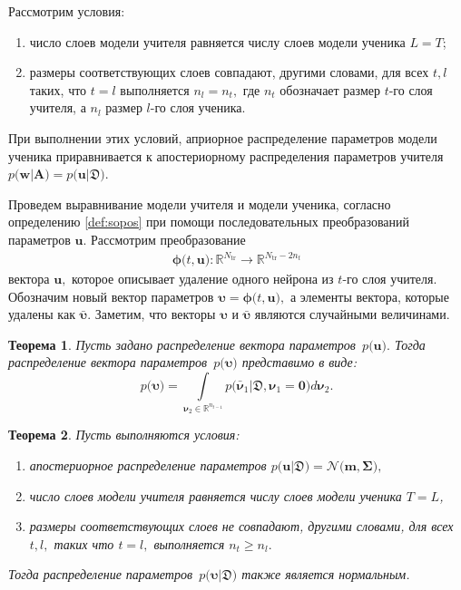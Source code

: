 \documentclass{dissert}
\newtheorem{theorem}{Теорема}
\begin{document}
Рассмотрим условия:
\begin{enumerate}[1)]
    \item число слоев модели учителя равняется числу слоев модели ученика $L=T$;
    \item размеры соответствующих слоев совпадают, другими словами, для всех $t, l$ таких, что $t=l$ выполняется $n_l = n_t,$ где $n_t$ обозначает размер $t$-го слоя учителя, а $n_l$ размер $l$-го слоя ученика.
\end{enumerate}
При выполнении этих условий, априорное распределение параметров модели ученика приравнивается к апостериорному распределения параметров учителя $p\bigr(\mathbf{w}|\mathbf{A}\bigr) = p\bigr(\mathbf{u}|\mathfrak{D}\bigr)$.


Проведем выравнивание модели учителя и модели ученика, согласно определению \ref{def:sopos} при помощи последовательных преобразований параметров $\mathbf{u}$. Рассмотрим преобразование
\[
\label{ch:3:eq:ap:2}
\begin{aligned}
\bm{\phi}\bigr(t, \mathbf{u}\bigr) : \mathbb{R}^{N_{\text{tr}}} \to \mathbb{R}^{N_{\text{tr}}-2n_t}
\end{aligned}
\]
вектора $\mathbf{u},$ которое описывает удаление одного нейрона из $t$-го слоя учителя.
Обозначим новый вектор параметров $\bm{\upsilon} =  \bm{\phi}\bigr(t, \mathbf{u}\bigr),$ а элементы вектора, которые удалены как $\bar{\bm{\upsilon}}.$ Заметим, что векторы $\bm{\upsilon}$ и $\bar{\bm{\upsilon}}$ являются случайными величинами. 

\begin{theorem}
Пусть задано распределение вектора параметров~$p\bigr(\mathbf{u}\bigr).$ Тогда распределение вектора параметров~$p\bigr(\bm{\upsilon}\bigr)$ представимо в виде:
\[
p\bigr(\bm{\upsilon}\bigr)  = \int\limits_{ \bm{\nu}_2 \in \mathbb{R}^{n_{t-1}}}p\bigr(\bar{\bm{\nu}}_1|\mathfrak{D}, \bm{\nu}_1=\mathbf{0}\bigr) d \bm{\nu}_2.
\]
\end{theorem}

\begin{theorem}
\label{theorem:ap:neural}
Пусть выполняются условия:
\begin{enumerate}[1)]
\item апостериорное распределение параметров $p\bigr(\mathbf{u}|\mathfrak{D}\bigr) = \mathcal{N}\bigr(\mathbf{m}, \bm{\Sigma}\bigr),$
\item число слоев модели учителя равняется числу слоев модели ученика $T=L$,
\item размеры соответствующих слоев не совпадают, другими словами, для всех $t, l,$ таких что $t=l,$ выполняется $n_t \geq n_l.$
\end{enumerate}
Тогда распределение параметров~$p\bigr(\bm{\upsilon}|\mathfrak{D}\bigr)$ также является нормальным.
\end{theorem}
\end{document}
